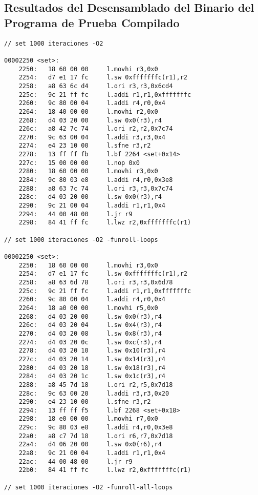 \subsection{Resultados del Desensamblado del Binario del Programa de Prueba Compilado}

	\begin{lstlisting}[frame=single]
// set 1000 iteraciones -O2

00002250 <set>:
    2250:	18 60 00 00 	l.movhi r3,0x0
    2254:	d7 e1 17 fc 	l.sw 0xfffffffc(r1),r2
    2258:	a8 63 6c d4 	l.ori r3,r3,0x6cd4
    225c:	9c 21 ff fc 	l.addi r1,r1,0xfffffffc
    2260:	9c 80 00 04 	l.addi r4,r0,0x4
    2264:	18 40 00 00 	l.movhi r2,0x0
    2268:	d4 03 20 00 	l.sw 0x0(r3),r4
    226c:	a8 42 7c 74 	l.ori r2,r2,0x7c74
    2270:	9c 63 00 04 	l.addi r3,r3,0x4
    2274:	e4 23 10 00 	l.sfne r3,r2
    2278:	13 ff ff fb 	l.bf 2264 <set+0x14>
    227c:	15 00 00 00 	l.nop 0x0
    2280:	18 60 00 00 	l.movhi r3,0x0
    2284:	9c 80 03 e8 	l.addi r4,r0,0x3e8
    2288:	a8 63 7c 74 	l.ori r3,r3,0x7c74
    228c:	d4 03 20 00 	l.sw 0x0(r3),r4
    2290:	9c 21 00 04 	l.addi r1,r1,0x4
    2294:	44 00 48 00 	l.jr r9
    2298:	84 41 ff fc 	l.lwz r2,0xfffffffc(r1)

// set 1000 iteraciones -O2 -funroll-loops

00002250 <set>:
    2250:	18 60 00 00 	l.movhi r3,0x0
    2254:	d7 e1 17 fc 	l.sw 0xfffffffc(r1),r2
    2258:	a8 63 6d 78 	l.ori r3,r3,0x6d78
    225c:	9c 21 ff fc 	l.addi r1,r1,0xfffffffc
    2260:	9c 80 00 04 	l.addi r4,r0,0x4
    2264:	18 a0 00 00 	l.movhi r5,0x0
    2268:	d4 03 20 00 	l.sw 0x0(r3),r4
    226c:	d4 03 20 04 	l.sw 0x4(r3),r4
    2270:	d4 03 20 08 	l.sw 0x8(r3),r4
    2274:	d4 03 20 0c 	l.sw 0xc(r3),r4
    2278:	d4 03 20 10 	l.sw 0x10(r3),r4
    227c:	d4 03 20 14 	l.sw 0x14(r3),r4
    2280:	d4 03 20 18 	l.sw 0x18(r3),r4
    2284:	d4 03 20 1c 	l.sw 0x1c(r3),r4
    2288:	a8 45 7d 18 	l.ori r2,r5,0x7d18
    228c:	9c 63 00 20 	l.addi r3,r3,0x20
    2290:	e4 23 10 00 	l.sfne r3,r2
    2294:	13 ff ff f5 	l.bf 2268 <set+0x18>
    2298:	18 e0 00 00 	l.movhi r7,0x0
    229c:	9c 80 03 e8 	l.addi r4,r0,0x3e8
    22a0:	a8 c7 7d 18 	l.ori r6,r7,0x7d18
    22a4:	d4 06 20 00 	l.sw 0x0(r6),r4
    22a8:	9c 21 00 04 	l.addi r1,r1,0x4
    22ac:	44 00 48 00 	l.jr r9
    22b0:	84 41 ff fc 	l.lwz r2,0xfffffffc(r1)

// set 1000 iteraciones -O2 -funroll-all-loops


\end{lstlisting}
